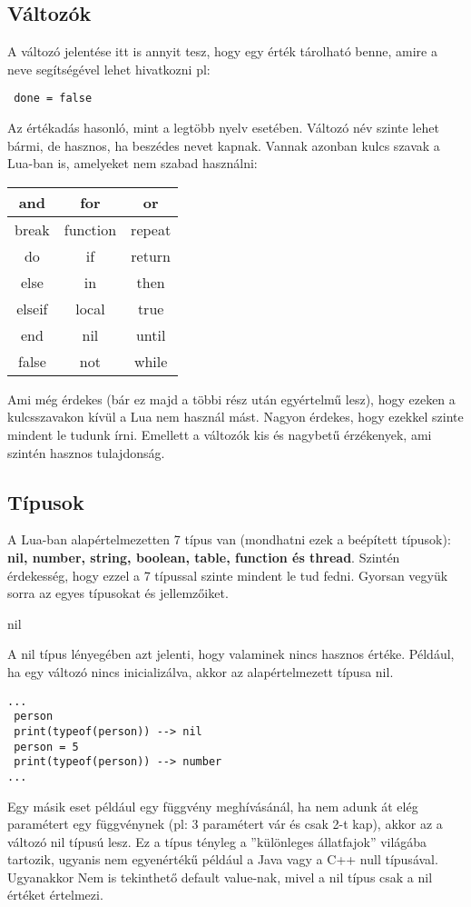 \subsection{Változók}
\label{subsec:l_variables}
A változó jelentése itt is annyit tesz, hogy egy érték tárolható benne, amire a neve segítségével lehet hivatkozni pl:
\scriptsize
\begin{lstlisting}
 done = false
\end{lstlisting}
\normalsize
Az értékadás hasonló, mint a legtöbb nyelv esetében. Változó név szinte lehet bármi, de hasznos, ha beszédes nevet kapnak. Vannak azonban kulcs szavak a Lua-ban is, amelyeket nem szabad használni:
\scriptsize
\begin{table}[hbt]
	\centering
	\begin{tabular}{|c|c|c|}
		\hline
		and & for & or \\
		\hline
		break & function & repeat \\
		\hline
		do & if & return \\
		\hline
		else & in & then \\
		\hline
		elseif & local & true \\
		\hline
		end & nil & until \\
		\hline
		false & not & while \\
		\hline
	\end{tabular}
\end{table}

Ami még érdekes (bár ez majd a többi rész után egyértelmű lesz), hogy ezeken a kulcsszavakon kívül a Lua nem használ mást. Nagyon érdekes, hogy ezekkel szinte mindent le tudunk írni. Emellett a változók kis és nagybetű érzékenyek, ami szintén hasznos tulajdonság.

\subsection{Típusok}
\label{subsec:l_types}

A Lua-ban alapértelmezetten 7 típus van (mondhatni ezek a beépített típusok): \textbf{nil, number, string, boolean, table, function és thread}. Szintén érdekesség, hogy ezzel a 7 típussal szinte mindent le tud fedni. Gyorsan vegyük sorra az egyes típusokat és jellemzőiket.

\bigskip

\Large nil \normalsize

\bigskip

A nil típus lényegében azt jelenti, hogy valaminek nincs hasznos értéke. Például, ha egy változó nincs inicializálva, akkor az alapértelmezett típusa nil. 
\scriptsize
\begin{lstlisting}
...
 person
 print(typeof(person)) --> nil
 person = 5  
 print(typeof(person)) --> number
...
\end{lstlisting}
\normalsize
Egy másik eset például egy függvény meghívásánál, ha nem adunk át elég paramétert egy függvénynek (pl: 3 paramétert vár és csak 2-t kap), akkor az a változó nil típusú lesz. Ez a típus tényleg a ''különleges állatfajok'' világába tartozik, ugyanis nem egyenértékű például a Java vagy a C++ null típusával. Ugyanakkor Nem is tekinthető default value-nak, mivel a nil típus csak a nil értéket értelmezi. 

